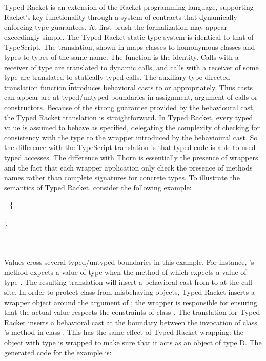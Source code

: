 \documentclass[acmlarge, anonymous, authordraft, review]{acmart} %
\begin{document}
Typed Racket is an extension of the Racket programming language, supporting
Racket's key functionality through a system of contracts that dynamically
enforcing type guarantees.  At first brush the formalization may appear
exceedingly simple.  The Typed Racket static type system is identical to
that of TypeScript. The translation, shown in  maps classes to
homonymous classes and types to types of the same name. The  function
is the identity.  Calls with a receiver of type \any are translated to
\kafka dynamic calls, and calls with a receiver of some type \C are
translated to statically typed calls. The auxiliary type-directed
translation function \TAG\e\Env\t introduces behavioral casts to \any or \C
appropriately. Thus casts can appear are at typed/untyped boundaries in
assignment, argument of calls or constructors. Because of the strong
guarantee provided by the behavioural cast, the Typed Racket translation is
straightforward. In Typed Racket, every typed value is assumed to behave as
specified, delegating the complexity of checking for consistency with the
type to the wrapper introduced by the behavioural cast.  So the difference
with the TypeScript translation is that typed code is able to used typed
accesses. The difference with Thorn is essentially the presence of wrappers
and the fact that each wrapper application only check the presence of
methods names rather than complete signatures for concrete types.  To
illustrate the semantics of Typed Racket, consider the following example:

\medskip
\begin{minipage}{\textwidth}
\begin{tabbing}
 \HS\HS\HS
  \Call{\New\A{}}\m{\New\C{}}
  \HS\HS\HS\HS \WHERE \HS\K\HS=\HS\=
  \class\=  \A \{ \\
  \>\> \Mdef\m\x\any\any{ ~ \Call{\New\D{}}\m\x ~} \\
  \> \}\\
 \> \Class \C{}{\Mdef\m\x\any\any{~\x~}} \\
 \> \Class \D{}{\Mdef\m\x\D\D{~\Call\x\m\x~}} \\
\end{tabbing}
\end{minipage}
\medskip

\noindent Values cross several typed/untyped boundaries in this example.
For instance, \A's method \m expects a value of type \any when the method 
\m of \D which expects a value of type \D.  The resulting
translation will insert a behavioral cast from \any to \D at the call site.  
In order to protect class \D from misbehaving objects, Typed Racket inserts a wrapper
object around the argument of \D; the wrapper is responsible for ensuring
that the actual value respects the constraints of class \D.  The \kafka
translation for Typed Racket inserts a behavioral cast at the boundary
between the invocation of class \D's method \m in class \A.  This has the
same effect of Typed Racket wrapping: the object with type \C is wrapped to
make sure that it acts as an object of type {\xt D}.  The generated \kafka
code for the example is:
\end{document}
